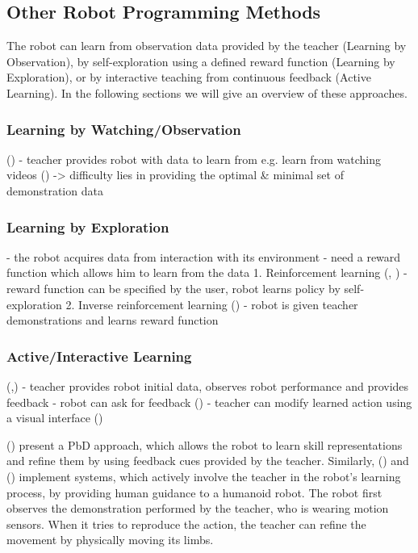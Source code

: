 \subsection{Other Robot Programming Methods}\label{subsec:Other RP Methods}
The robot can learn from observation data provided by the teacher (Learning by Observation), by self-exploration using a defined reward function (Learning by Exploration), or by interactive teaching from continuous feedback (Active Learning). In the following sections we will give an overview of these approaches.

\subsubsection{Learning by Watching/Observation}\label{sssec:LbObservation}
(\cite{kuniyoshi1994learning})
- teacher provides robot with data to learn from e.g. learn from watching videos (\cite{Yang2015})
     -> difficulty lies in providing the optimal \& minimal set of demonstration data

\subsubsection{Learning by Exploration}\label{sssec:LbExploration}
- the robot acquires data from interaction with its environment
- need a reward function which allows him to learn from the data
1. Reinforcement learning (\cite{sutton1998reinforcement}, \cite{mnih2015human})
     - reward function can be specified by the user, robot learns policy by self-exploration
    2. Inverse reinforcement learning (\cite{abbeel2004apprenticeship})
     - robot is given teacher demonstrations and learns reward function

 
\subsubsection{Active/Interactive Learning}\label{sssec:Active Learning} (\cite{chernova2014robot},\cite{calinon2007active})
 - teacher provides robot initial data, observes robot performance and provides feedback
     - robot can ask for feedback (\cite{cakmak2012aaai})
 - teacher can modify learned action using a visual interface (\cite{alexandrova2015roboflow})

 (\cite{nicolescu2003natural}) present a PbD approach, which allows the robot to learn skill representations and refine them by using feedback cues provided by the teacher.
Similarly, (\cite{calinon2007active}) and (\cite{calinon2007incremental}) implement systems, which actively involve the teacher in the robot's learning process, by providing human guidance to a humanoid robot. The robot first observes the demonstration performed by the teacher, who is wearing motion sensors. When it tries to reproduce the action, the teacher can refine the movement by physically moving its limbs.

